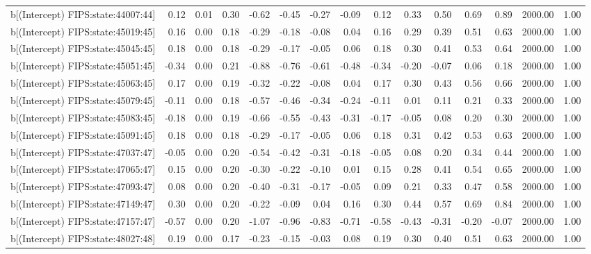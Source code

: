 \begin{table}[ht]
\begin{tabular}{rrrrrrrrrrrrrrr}
  b[(Intercept) FIPS:state:44007:44] & 0.12 & 0.01 & 0.30 & -0.62 & -0.45 & -0.27 & -0.09 & 0.12 & 0.33 & 0.50 & 0.69 & 0.89 & 2000.00 & 1.00 \\ 
  b[(Intercept) FIPS:state:45019:45] & 0.16 & 0.00 & 0.18 & -0.29 & -0.18 & -0.08 & 0.04 & 0.16 & 0.29 & 0.39 & 0.51 & 0.63 & 2000.00 & 1.00 \\ 
  b[(Intercept) FIPS:state:45045:45] & 0.18 & 0.00 & 0.18 & -0.29 & -0.17 & -0.05 & 0.06 & 0.18 & 0.30 & 0.41 & 0.53 & 0.64 & 2000.00 & 1.00 \\ 
  b[(Intercept) FIPS:state:45051:45] & -0.34 & 0.00 & 0.21 & -0.88 & -0.76 & -0.61 & -0.48 & -0.34 & -0.20 & -0.07 & 0.06 & 0.18 & 2000.00 & 1.00 \\ 
  b[(Intercept) FIPS:state:45063:45] & 0.17 & 0.00 & 0.19 & -0.32 & -0.22 & -0.08 & 0.04 & 0.17 & 0.30 & 0.43 & 0.56 & 0.66 & 2000.00 & 1.00 \\ 
  b[(Intercept) FIPS:state:45079:45] & -0.11 & 0.00 & 0.18 & -0.57 & -0.46 & -0.34 & -0.24 & -0.11 & 0.01 & 0.11 & 0.21 & 0.33 & 2000.00 & 1.00 \\ 
  b[(Intercept) FIPS:state:45083:45] & -0.18 & 0.00 & 0.19 & -0.66 & -0.55 & -0.43 & -0.31 & -0.17 & -0.05 & 0.08 & 0.20 & 0.30 & 2000.00 & 1.00 \\ 
  b[(Intercept) FIPS:state:45091:45] & 0.18 & 0.00 & 0.18 & -0.29 & -0.17 & -0.05 & 0.06 & 0.18 & 0.31 & 0.42 & 0.53 & 0.63 & 2000.00 & 1.00 \\ 
  b[(Intercept) FIPS:state:47037:47] & -0.05 & 0.00 & 0.20 & -0.54 & -0.42 & -0.31 & -0.18 & -0.05 & 0.08 & 0.20 & 0.34 & 0.44 & 2000.00 & 1.00 \\ 
  b[(Intercept) FIPS:state:47065:47] & 0.15 & 0.00 & 0.20 & -0.30 & -0.22 & -0.10 & 0.01 & 0.15 & 0.28 & 0.41 & 0.54 & 0.65 & 2000.00 & 1.00 \\ 
  b[(Intercept) FIPS:state:47093:47] & 0.08 & 0.00 & 0.20 & -0.40 & -0.31 & -0.17 & -0.05 & 0.09 & 0.21 & 0.33 & 0.47 & 0.58 & 2000.00 & 1.00 \\ 
  b[(Intercept) FIPS:state:47149:47] & 0.30 & 0.00 & 0.20 & -0.22 & -0.09 & 0.04 & 0.16 & 0.30 & 0.44 & 0.57 & 0.69 & 0.84 & 2000.00 & 1.00 \\ 
  b[(Intercept) FIPS:state:47157:47] & -0.57 & 0.00 & 0.20 & -1.07 & -0.96 & -0.83 & -0.71 & -0.58 & -0.43 & -0.31 & -0.20 & -0.07 & 2000.00 & 1.00 \\ 
  b[(Intercept) FIPS:state:48027:48] & 0.19 & 0.00 & 0.17 & -0.23 & -0.15 & -0.03 & 0.08 & 0.19 & 0.30 & 0.40 & 0.51 & 0.63 & 2000.00 & 1.00 \\ 

\end{tabular}
\end{table}
